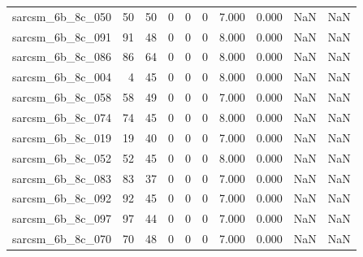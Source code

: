 \documentclass{article}
\begin{document}
\begin{longtable}{lrrrrrrrrr}
sarcsm\_6b\_8c\_050 & 50 & 50 & 0 & 0 & 0 & 7.000 & 0.000 & NaN & NaN \\
sarcsm\_6b\_8c\_091 & 91 & 48 & 0 & 0 & 0 & 8.000 & 0.000 & NaN & NaN \\
sarcsm\_6b\_8c\_086 & 86 & 64 & 0 & 0 & 0 & 8.000 & 0.000 & NaN & NaN \\
sarcsm\_6b\_8c\_004 & 4 & 45 & 0 & 0 & 0 & 8.000 & 0.000 & NaN & NaN \\
sarcsm\_6b\_8c\_058 & 58 & 49 & 0 & 0 & 0 & 7.000 & 0.000 & NaN & NaN \\
sarcsm\_6b\_8c\_074 & 74 & 45 & 0 & 0 & 0 & 8.000 & 0.000 & NaN & NaN \\
sarcsm\_6b\_8c\_019 & 19 & 40 & 0 & 0 & 0 & 7.000 & 0.000 & NaN & NaN \\
sarcsm\_6b\_8c\_052 & 52 & 45 & 0 & 0 & 0 & 8.000 & 0.000 & NaN & NaN \\
sarcsm\_6b\_8c\_083 & 83 & 37 & 0 & 0 & 0 & 7.000 & 0.000 & NaN & NaN \\
sarcsm\_6b\_8c\_092 & 92 & 45 & 0 & 0 & 0 & 7.000 & 0.000 & NaN & NaN \\
sarcsm\_6b\_8c\_097 & 97 & 44 & 0 & 0 & 0 & 7.000 & 0.000 & NaN & NaN \\
sarcsm\_6b\_8c\_070 & 70 & 48 & 0 & 0 & 0 & 7.000 & 0.000 & NaN & NaN \\
\end{longtable}
\end{document}
